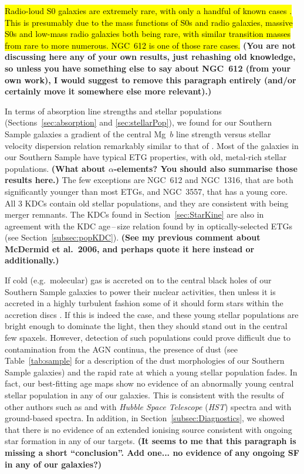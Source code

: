 \documentclass[a4paper,fleqn,usenatbib]{mnras}
\DeclareRobustCommand{\removed}[1]{{\sethlcolor{red}\hl{#1}}}
\DeclareRobustCommand{\added}[1]{{\sethlcolor{green}\hl{#1}}}
\begin{document}
\removed{Radio-loud S0 galaxies are extremely rare, with only a handful of
known cases \citep[e.g.][]{Heckman1982, Morganti2011}. This is
presumably due to the mass functions of S0s and radio galaxies,
massive S0s and low-mass radio galaxies both being rare, with similar
transition masses from rare to more numerous. NGC~612 is one of those
rare cases.} {\bf (You are not discussing here any of your own results,
  just rehashing old knowledge, so unless you have something else to
  say about NGC~612 (from your own work), I would suggest to remove
  this paragraph entirely (and/or certainly move it somewhere else
  more relevant).)}

In terms of absorption line strengths and stellar populations
(Sections~\ref{sec:absorption} and \ref{sec:stellarPop}), we found for
our Southern Sample galaxies a gradient of the central Mg~$b$ line
strength versus stellar velocity dispersion relation remarkably
similar to that of \citet{Ziegler1997}. Most of the galaxies in our
Southern Sample have typical ETG properties, with old, metal-rich
stellar populations. {\bf (What about $\alpha$-elements? You should
  also summarise those results here.)} The few exceptions are NGC~612
and NGC~1316, that are both significantly younger than most ETGs, and
NGC~3557, that has a young core. All $3$ KDCs contain old stellar
populations, and they are consistent with being merger remnants. The
KDCs found in Section~\ref{sec:StarKine} are also in agreement with
the KDC age\,--\,size relation found by \added{\citet{McDermid2006}} 
\removed{\citet{Kuntschner2010}} in optically-selected ETGs (see 
Section~\ref{subsec:popKDC}). {\bf (See my previous comment about 
McDermid et al.\ 2006, and perhaps quote it here instead or 
additionally.)}

If cold (e.g.\ molecular) gas is accreted on to the central black
holes of our Southern Sample galaxies to power their nuclear
activities, then unless it is accreted in a highly turbulent fashion
some of it should form stars within the accretion discs
\citep[e.g.][]{Collin1999, Diamond-Stanic2012, LaMassa2013}. If this
is indeed the case, and these young stellar populations are bright
enough to dominate the light, then they should stand out in the
central few spaxels. However, detection of such populations could
prove difficult due to contamination from the AGN continua, the
presence of dust (see Table~\ref{tab:sample} for a description of the
dust morphologies of our Southern Sample galaxies) and the rapid rate
at which a young stellar population fades. In fact, our best-fitting
age maps show no evidence of an abnormally young central stellar
population in any of our galaxies. This is consistent with the results
of other authors such as \citet{GonzalezDelgado2004} and
\citet{Sarzi2005b} with \textit{Hubble Space Telescope} (\textit{HST})
spectra and \citet{CidFernandes2004} with ground-based spectra. In
addition, in Section~\ref{subsec:Diagnostics}, we showed that there is
no evidence of an extended ionising source consistent with ongoing
star formation in any of our targets. {\bf (It seems to me that this
  paragraph is missing a short ``conclusion''. Add one... no evidence
  of any ongoing SF in any of our galaxies?)}
\end{document}
